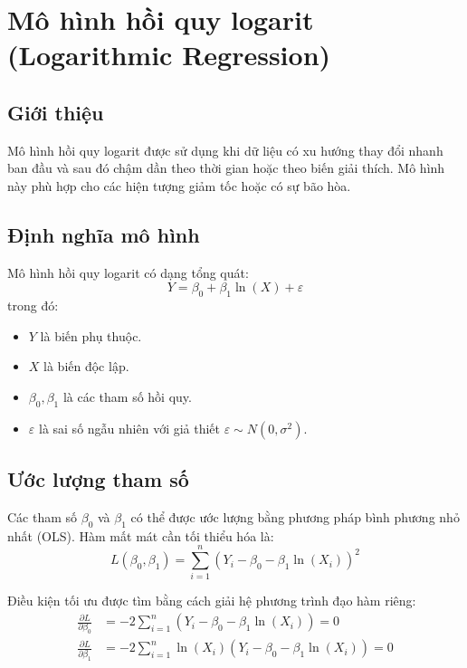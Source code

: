 \chapter{Mô hình hồi quy logarit (Logarithmic Regression)}
\section{Giới thiệu}
Mô hình hồi quy logarit được sử dụng khi dữ liệu có xu hướng thay đổi nhanh ban đầu và sau đó chậm dần theo thời gian hoặc theo biến giải thích. Mô hình này phù hợp cho các hiện tượng giảm tốc hoặc có sự bão hòa.

\section{Định nghĩa mô hình}
Mô hình hồi quy logarit có dạng tổng quát:
\begin{equation}
    Y = \beta_0 + \beta_1 \ln(X) + \varepsilon
\end{equation}
trong đó:
\begin{itemize}
    \item $Y$ là biến phụ thuộc.
    \item $X$ là biến độc lập.
    \item $\beta_0, \beta_1$ là các tham số hồi quy.
    \item $\varepsilon$ là sai số ngẫu nhiên với giả thiết $\varepsilon \sim N(0, \sigma^2)$.
\end{itemize}

\section{Ước lượng tham số}
Các tham số $\beta_0$ và $\beta_1$ có thể được ước lượng bằng phương pháp bình phương nhỏ nhất (OLS). Hàm mất mát cần tối thiểu hóa là:
\begin{equation}
    L(\beta_0, \beta_1) = \sum_{i=1}^{n} \left(Y_i - \beta_0 - \beta_1 \ln(X_i)\right)^2
\end{equation}

Điều kiện tối ưu được tìm bằng cách giải hệ phương trình đạo hàm riêng:
\begin{align}
    \frac{\partial L}{\partial \beta_0} &= -2 \sum_{i=1}^{n} \left(Y_i - \beta_0 - \beta_1 \ln(X_i)\right) = 0 \\
    \frac{\partial L}{\partial \beta_1} &= -2 \sum_{i=1}^{n} \ln(X_i) \left(Y_i - \beta_0 - \beta_1 \ln(X_i)\right) = 0
\end{align}


